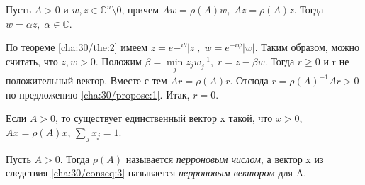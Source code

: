 
\begin{theorem}[]\label{cha:30/the:3}
	Пусть $A > 0$ и $w, z \in \mathbb{C}^n \setminus 0$, причем $\displaystyle Aw = \rho(A)w, \; Az = \rho(A)z$. Тогда $w = \alpha z, \; \alpha \in \mathbb{C}$.
\end{theorem}
\begin{Proof}
	По теореме \ref{cha:30/the:2} имеем $\displaystyle z = e−^{i\theta}|z|, \; w = e^{−i\psi}|w|$. Таким образом, можно считать, что $z, w > 0$. Положим $\beta = \underset{j}{\min} z_j w_j^{-1}, \; r = z - \beta w$. Тогда $r \ge 0$ и r не положительный вектор. Вместе с тем $Ar = \rho(A)r$. Отсюда $r = \rho(A)^{−1}Ar > 0$ по предложению \ref{cha:30/propose:1}. Итак, $r = 0$.
\end{Proof}

\begin{conseq}[]\label{cha:30/conseq:3}
	Если $A > 0$, то существует единственный вектор x такой, что $x>0$, $Ax = \rho(A)x$, $\underset{j}{\overset{}{\sum}}x_j = 1$.
\end{conseq}

\begin{definition}\label{cha:30/def:1}
	Пусть $A > 0$. Тогда $\rho(A)$ называется \textit{перроновым числом}, а вектор x из следствия \ref{cha:30/conseq:3} называется \textit{перроновым вектором} для A.
\end{definition}

























